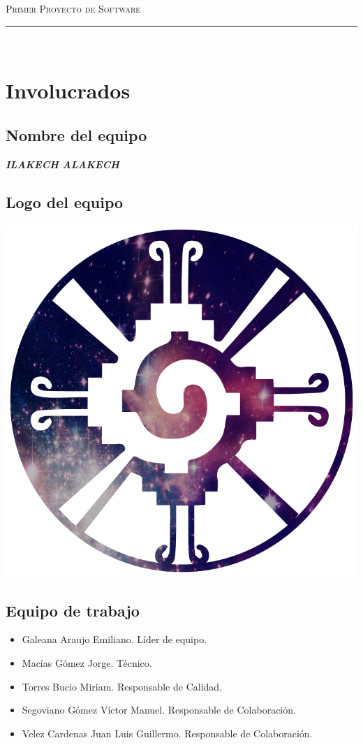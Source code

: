 \documentclass{article}
\begin{document}
\marginsize{2cm}{2cm}{1cm}{2cm} 

\begin{center}
  {\LARGE \scshape Primer Proyecto de Software\\\vspace{10mm} }
  \rule{0.8\textwidth}{.8pt}\\
\end{center}

\section*{Involucrados}
\subsection*{Nombre del equipo} \textit{\textbf{ILAKECH ALAKECH}}
\subsection*{Logo del equipo}
\begin{center}
  \includegraphics[scale=.2]{../imagenes/logo.jpg}
\end{center}

\subsection*{Equipo de trabajo}
\begin{itemize}
\item Galeana Araujo Emiliano. Líder de equipo.
\item Macías Gómez Jorge. Técnico.
\item Torres Bucio Miriam. Responsable de Calidad.
\item Segoviano Gómez Víctor Manuel. Responsable de Colaboración.
\item Velez Cardenas Juan Luis Guillermo. Responsable de Colaboración.
\end{itemize}
\end{document}
